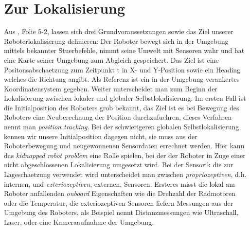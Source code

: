 \documentclass[11pt,a4paper]{article}
\begin{document}
\section{Zur Lokalisierung}
Aus \cite{website:lokalisierung}, Folie 5-2, lassen sich drei Grundvoraussetzungen sowie das Ziel unserer Roboterlokalisierung definieren: Der Roboter bewegt sich in der Umgebung mittels bekannter Stuerbefehle,
nimmt seine Umwelt mit Sensoren wahr und hat eine Karte seiner Umgebung zum Abgleich gespeichert. Das Ziel ist eine Positonsabschaetzung zum Zeitpunkt t in X- und Y-Position sowie ein Heading welches
die Richtung angibt. Als Referenz ist ein in der Umgebung verankertes Koordinatensystem gegeben. Weiter unterscheidet man zum Beginn der Lokalisierung zwischen lokaler und globaler
Selbstlokalisierung. Im ersten Fall ist die Initialposition des Roboters grob bekannt, das Ziel ist es bei Bewegung des Roboters eine Neuberechnung der Position durchzufuehren,
dieses Verfahren nennt man \textit{position tracking}. Bei der schwierigeren globalen Selbstlokalisierung kennen wir unsere Initialposition dagegen nicht, sie muss aus der 
Roboterbewegung und neugewonnenen Sensordaten errechnet werden. Hier kann das \textit{kidnapped robot problem} eine Rolle spielen, bei der der Roboter in Zuge einer nicht abgeschlossenen Lokalisierung
umgesetzt wird.
Bei der Sensorik die zur Lageschaetzung verwendet wird unterscheidet man zwischen \textit{propriozeptiven}, d.h. internen, und \textit{exteriozeptiven}, externen, Sensoren. 
Ersteres misst die lokal am Roboter anfallenden \textit{onboard} \cite{website:robotik} Eigenschaften wie die Drehzahl der Radmotoren oder die Temperatur, die 
exteriozeptiven Sensoren liefern Messungen aus der Umgebung des Roboters, als Beispiel nennt \cite{website:robotik} Distanzmessungen wie Ultraschall, Laser, oder eine Kameraaufnahme der Umgebung.
\end{document}
